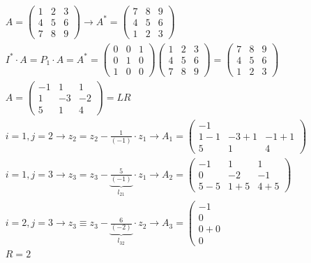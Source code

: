 \documentclass[10pt]{article}
\begin{document}
$$
\begin{gathered}
A=\left(\begin{array}{lll}
1 & 2 & 3 \\
4 & 5 & 6 \\
7 & 8 & 9
\end{array}\right) \rightarrow A^{*}=\left(\begin{array}{lll}
7 & 8 & 9 \\
4 & 5 & 6 \\
1 & 2 & 3
\end{array}\right) \\
I^{*} \cdot A=P_{1} \cdot A=A^{*}=\left(\begin{array}{lll}
0 & 0 & 1 \\
0 & 1 & 0 \\
1 & 0 & 0
\end{array}\right)\left(\begin{array}{lll}
1 & 2 & 3 \\
4 & 5 & 6 \\
7 & 8 & 9
\end{array}\right)=\left(\begin{array}{lll}
7 & 8 & 9 \\
4 & 5 & 6 \\
1 & 2 & 3
\end{array}\right) \\
A=\left(\begin{array}{ccc}
-1 & 1 & 1 \\
1 & -3 & -2 \\
5 & 1 & 4
\end{array}\right)=L R \\
i=1, j=2 \rightarrow z_{2}=z_{2}-\frac{1}{(-1)} \cdot z_{1} \rightarrow A_{1}=\left(\begin{array}{ccc}
-1 \\
1-1 & -3+1 & -1+1 \\
5 & 1 & 4
\end{array}\right) \\
i=1, j=3 \rightarrow z_{3}=z_{3}-\underbrace{\frac{5}{(-1)}}_{l_{21}} \cdot z_{1} \rightarrow A_{2}=\left(\begin{array}{ccc}
-1 & 1 & 1 \\
0 & -2 & -1 \\
5-5 & 1+5 & 4+5
\end{array}\right) \\
i=2, j=3 \rightarrow z_{3} \equiv z_{3}-\underbrace{\frac{6}{(-2)}}_{l_{32}} \cdot z_{2} \rightarrow A_{3}=\left(\begin{array}{c}
-1 \\
0 \\
0+0 \\
0
\end{array}\right. \\
R=2
\end{gathered}
$$
\end{document}
